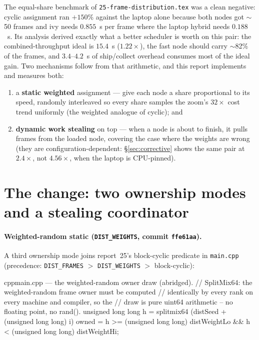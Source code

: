 \documentclass[
	english,
	letterpaper, oneside
]{article}
\begin{document}
The equal-share benchmark of \texttt{25-frame-distribution.tex} was a clean
negative: cyclic assignment ran $+150\%$ against the laptop alone because
both nodes got $\sim$50 frames and ivy needs $0.855$~s per frame where the
laptop hybrid needs $0.188$~s. Its analysis derived exactly what a better
scheduler is worth on this pair: the combined-throughput ideal is $15.4$~s
($1.22\times$), the fast node should carry $\sim$82\% of the frames, and
$3.4$--$4.2$~s of ship/collect overhead consumes most of the ideal gain.
Two mechanisms follow from that arithmetic, and this report implements and
measures both:

\begin{enumerate}
  \item a \textbf{static weighted} assignment --- give each node a share
        proportional to its speed, randomly interleaved so every share
        samples the zoom's $32\times$ cost trend uniformly (the weighted
        analogue of cyclic); and
  \item \textbf{dynamic work stealing} on top --- when a node is about to
        finish, it pulls frames from the loaded node, covering the case
        where the weights are wrong (they are configuration-dependent:
        \S\ref{sec:corrective} shows the same pair at $2.4\times$, not
        $4.56\times$, when the laptop is CPU-pinned).
\end{enumerate}

\section{The change: two ownership modes and a stealing coordinator}
\label{sec:change}

\paragraph{Weighted-random static (\texttt{DIST\_WEIGHTS}, commit
\texttt{ffe61aa}).} A third ownership mode joins report~25's block-cyclic
predicate in \texttt{main.cpp} (precedence: \texttt{DIST\_FRAMES} $>$
\texttt{DIST\_WEIGHTS} $>$ block-cyclic):

\begin{sourcecode}{cpp}{main.cpp --- the weighted-random owner draw (abridged).}
// SplitMix64: the weighted-random frame owner must be computed
// identically by every rank on every machine and compiler, so the
// draw is pure uint64 arithmetic -- no floating point, no rand().
unsigned long long h =
  splitmix64 (distSeed + (unsigned long long) i)
owned = h >= (unsigned long long) distWeightLo
     && h <  (unsigned long long) distWeightHi;
\end{sourcecode}
\end{document}
